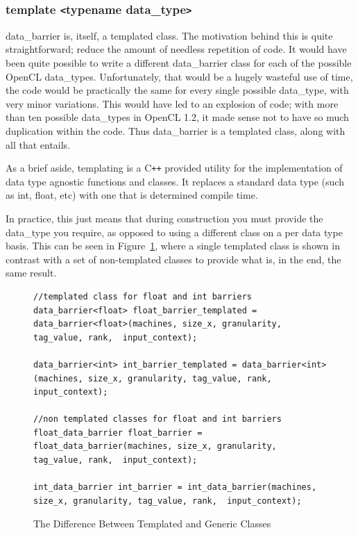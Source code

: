 \documentclass[../thesis.tex]{subfiles}
\begin{document}
  \subsubsection{template \texttt{<}typename data\_type\texttt{>}} %
  \label{ssub:template_typename_data_type}
    data\_barrier is, itself, a templated class. The motivation behind this is quite straightforward; reduce the amount of needless repetition of code. It would have been quite possible to write a different data\_barrier class for each of the possible OpenCL data\_types. Unfortunately, that would be a hugely wasteful use of time, the code would be practically the same for every single possible data\_type, with very minor variations. This would have led to an explosion of code; with more than ten possible data\_types \cite{opencldatatypes} in OpenCL 1.2, it made sense not to have so much duplication within the code. Thus data\_barrier is a templated class, along with all that entails.

    As a brief aside, templating is a C\texttt{++} provided utility for the implementation of data type agnostic functions and classes. It replaces a standard data type (such as int, float, etc) with one that is determined compile time.

    In practice, this just means that during construction you must provide the data\_type you require, as opposed to using a different class on a per data type basis. This can be seen in Figure~\ref{fig:templated_vs_non_templated}, where a single templated class is shown in contrast with a set of non-templated classes to provide what is, in the end, the same result.

    \begin{figure}[htbp]
      \centering

      \lstset{language=cpp}  
      \begin{lstlisting}[tabsize=2]
//templated class for float and int barriers
data_barrier<float> float_barrier_templated = data_barrier<float>(machines, size_x, granularity, tag_value, rank,  input_context);

data_barrier<int> int_barrier_templated = data_barrier<int>(machines, size_x, granularity, tag_value, rank,  input_context);

//non templated classes for float and int barriers
float_data_barrier float_barrier = float_data_barrier(machines, size_x, granularity, tag_value, rank,  input_context);

int_data_barrier int_barrier = int_data_barrier(machines, size_x, granularity, tag_value, rank,  input_context);
        \end{lstlisting}

      \caption{The Difference Between Templated and Generic Classes}
      \label{fig:templated_vs_non_templated}
    \end{figure}
  
\end{document}

